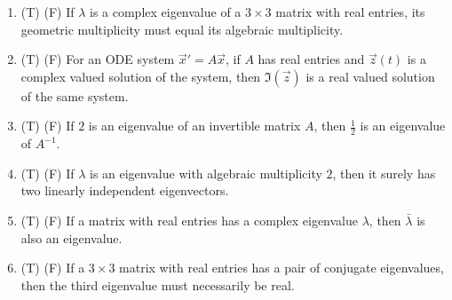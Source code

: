 \documentclass[12pt]{article}
\begin{document}
\begin{enumerate}
         then \(\lim_{t\to\infty}\vec{x}(t)=0\) for any solution \(\vec{x}\).
   \item (T) (F) If \(\lambda\) is a complex eigenvalue of a \(3\times 3\) matrix with real entries, its geometric multiplicity must equal its algebraic multiplicity.
   \item (T) (F) For an ODE system \(\vec{x}'=A\vec{x}\), if \(A\) has real entries and \(\vec{z}(t)\) is a complex valued solution of the system, then \(\Im(\vec{z})\) is a real valued solution of the same system.
   \item (T) (F) If \(2\) is an eigenvalue of an invertible matrix \(A\), then \(\frac12\) is an eigenvalue of \(A^{-1}\).
   \item (T) (F) If \(\lambda\) is an eigenvalue with algebraic multiplicity \(2\), then it surely has two linearly independent eigenvectors.
   \item (T) (F) If a matrix with real entries has a complex eigenvalue \(\lambda\), then \(\bar{\lambda}\) is also an eigenvalue.
   \item (T) (F) If a \(3\times 3\) matrix with real entries has a pair of conjugate eigenvalues, then the third eigenvalue must necessarily be real.

\end{enumerate}
\end{document}
